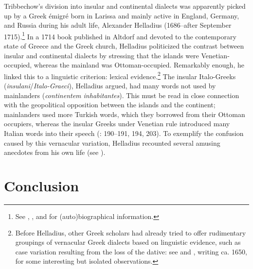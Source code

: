{Tribbechow’s division into insular and continental dialects was apparently picked up by a Greek émigré born in Larissa and mainly active in England, Germany, and Russia during his adult life, Alexander Helladius (1686–after September 1715).\footnote{See \citet{Helladius1714}, \citet[315--317]{Moennig1998}, and \citet{VanRooyFca} for (auto)biographical information.} In a 1714 book published in Altdorf and devoted to the contemporary state of Greece and the Greek church, Helladius politicized the contrast between insular and continental dialects by stressing that the islands were Venetian-oc\-cu\-pied, whereas the mainland was Ottoman-occupied. Remarkably enough, he linked this to a linguistic criterion: lexical evidence.\footnote{Before Helladius, other Greek scholars had already tried to offer rudimentary groupings of vernacular Greek dialects based on linguistic evidence, such as case variation resulting from the loss of the dative: see \citet[108]{Kritopoulos1924} and \citet[e.g. 1 \& 8]{Nikiforos1908}, writing ca. 1650, for some interesting but isolated observations.} The insular Italo-Greeks (\textit{insulani}/\textit{Italo-Graeci}), Helladius argued, had many words not used by mainlanders (\textit{continentem inhabitantes}). This must be read in close connection with the geopolitical opposition between the islands and the continent; mainlanders used more Turkish words, which they borrowed from their Ottoman occupiers, whereas the insular Greeks under Venetian rule introduced many Italian words into their speech (\citealt{Helladius1714}: 190–191, 194, 203). To exemplify the confusion caused by this vernacular variation, Helladius recounted several amusing anecdotes from his own life (see \citet{VanRooyFca}).

\section{Conclusion}\label{sec:2.11}

}
